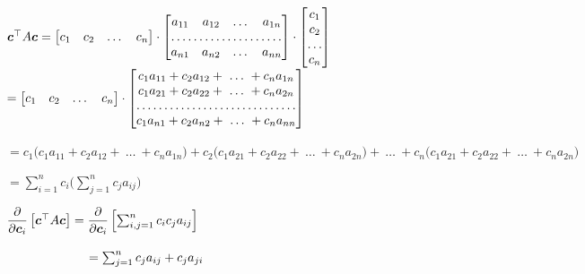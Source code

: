 \documentclass[12pt]{article}
\begin{document}

\begin{enumerate}


$\c^\top A \c = \begin{bmatrix}
c_1 & c_2 & \dots & c_n 
\end{bmatrix}
\cdot
\begin{bmatrix}
a_{11} & a_{12} & \dots & a_{1n}\\
\hdotsfor{4}\\
a_{n1} & a_{n2} & \dots & a_{nn}
\end{bmatrix}
\cdot
\begin{bmatrix}
c_1\\
c_2\\
\dots \\
c_n
\end{bmatrix}$ \newline 
$= \begin{bmatrix}
c_1 & c_2 & \dots & c_n 
\end{bmatrix} 
\cdot 
\begin{bmatrix}
c_1 a_{11} + c_2 a_{12} + \ \dots \ +c_n  a_{1n}\\
c_1 a_{21} + c_2 a_{22} + \ \dots \  +c_n  a_{2n}\\
\hdotsfor{1}\\
c_1 a_{n1} + c_2 a_{n2} + \ \dots \  + c_n a_{nn}
\end{bmatrix}$ \newline 

$ = c_1 \big( c_1 a_{11} + c_2 a_{12} + \ \dots \ +c_n  a_{1n} \big) + c_2 \big( c_1 a_{21} + c_2 a_{22} + \ \dots \  +c_n  a_{2n} \big) + \ \dots \ + c_n \big( c_1 a_{21} + c_2 a_{22} + \ \dots \  +c_n  a_{2n} \big) $ \newline

$= \sum_{i=1}^n c_i \bigg( \sum_{j=1}^n  c_j a_{ij} \bigg)$ \newline 

$ \dfrac{\partial}{\partial \boldsymbol{c}_i}\left[\boldsymbol{c}^\top A \boldsymbol{c}\right] = \dfrac{\partial}{\partial \boldsymbol{c}_i}\left[\sum_{i, j=1}^n c_i c_j a_{ij}\right] $ \newline 

$ \hspace*{2.3cm}  =  \sum_{j=1}^n c_j a_{ij} + c_j a_{ji}$


\end{enumerate}
\end{document}
